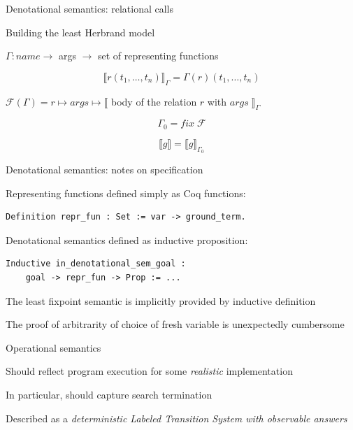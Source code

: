 \documentclass{beamer}
\let\\\tabularnewline
\let\\\tabularnewline
\theoremstyle{definition}
\theoremstyle{plain} %
\begin{document}
\begin{frame}{Denotational semantics: relational calls}

Building the least Herbrand model

\vskip5mm
\begin{center}

$ \Gamma \colon name \to $ args $ \to $ set of representing functions

\[ \llbracket r(t_1, \dots, t_n) \rrbracket_\Gamma = \Gamma(r)(t_1, \dots, t_n) \]

\vskip10mm

$ \mathcal{F}(\Gamma) = r \mapsto args \mapsto \llbracket$ body of the relation $r$ with $ args \; \rrbracket_\Gamma $

\[ \Gamma_0 = fix \; \mathcal{F} \]

\vskip-4mm

\[ \llbracket g \rrbracket  = \llbracket g \rrbracket_{\Gamma_0}  \]

\end{center}

\end{frame}



\begin{frame}[fragile]{Denotational semantics: notes on specification}

Representing functions defined simply as Coq functions:
\begin{lstlisting}
Definition repr_fun : Set := var -> ground_term.
\end{lstlisting}

\vskip5mm

Denotational semantics defined as inductive proposition:
\begin{lstlisting}
Inductive in_denotational_sem_goal :
    goal -> repr_fun -> Prop := ...
\end{lstlisting}

\vskip5mm

The least fixpoint semantic is implicitly provided by inductive definition

\vskip5mm

The proof of arbitrarity of choice of fresh variable is unexpectedly cumbersome

\end{frame}



\begin{frame}{Operational semantics}

Should reflect program execution for some \emph{realistic} implementation

\vskip3mm

In particular, should capture search termination

\vskip8mm

Described as a \emph{deterministic Labeled Transition System \\ with observable answers}

\end{frame}
\end{document}
